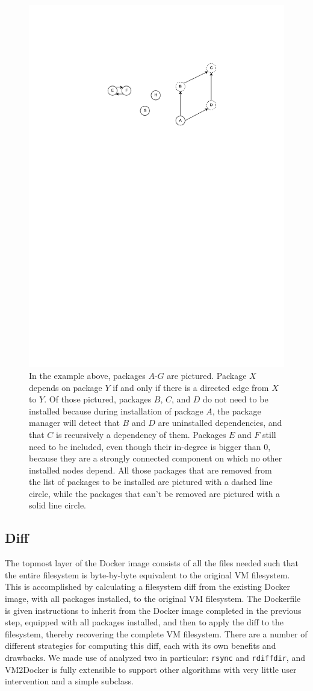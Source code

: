 \begin{figure}[h]
\centering

    \includegraphics[width=.6\textwidth]{depgraph.pdf}
    \caption{In the example above, packages $A$-$G$ are pictured. Package $X$ depends on package $Y$ if and only if there is a directed edge from $X$ to $Y$. Of those pictured, packages $B$, $C$, and $D$ do not need to be installed because during installation of package $A$, the package manager will detect that $B$ and $D$ are uninstalled dependencies, and that $C$ is recursively a dependency of them. Packages $E$ and $F$ still need to be included, even though their in-degree is bigger than 0, because they are a strongly connected component on which no other installed nodes depend. All those packages that are removed from the list of packages to be installed are pictured with a dashed line circle, while the packages that can't be removed are pictured with a solid line circle.}
   \label{fig:depgraph}
\end{figure}

\subsection{Diff}
\label{sec:diff}
The topmost layer of the Docker image consists of all the files needed such that the entire filesystem is byte-by-byte equivalent to the original VM filesystem. This is accomplished by calculating a filesystem diff from the existing Docker image, with all packages installed, to the original VM filesystem. The Dockerfile is given instructions to inherit from the Docker image completed in the previous step, equipped with all packages installed, and then to apply the diff to the filesystem, thereby recovering the complete VM filesystem. There are a number of different strategies for computing this diff, each with its own benefits and drawbacks. We made use of analyzed two in particular: \texttt{rsync} and \texttt{rdiffdir}, and VM2Docker is fully extensible to support other algorithms with very little user intervention and a simple subclass.



